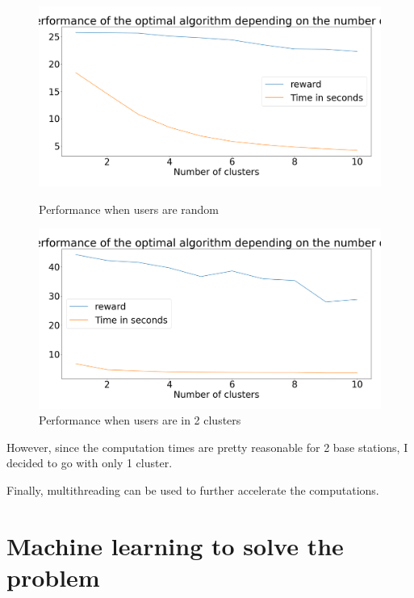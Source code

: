 \documentclass[letterpaper]{article}
\begin{document}
\begin{figure}[H]
    \centering
    \begin{minipage}[b]{0.45\textwidth}
        \centering
        \includegraphics[width=\textwidth]{images/Performance_opt_function_clusters.png}
        \caption{Performance when users are random}
    \end{minipage}
    \hspace{0.05\textwidth}
    \begin{minipage}[b]{0.45\textwidth}
        \centering
        \includegraphics[width=\textwidth]{images/Performance_opt_function_clusters_when_2clusters.png}
        \caption{Performance when users are in 2 clusters}
    \end{minipage}
\end{figure}

However, since the computation times are pretty reasonable for 2 base stations, I decided to go with only 1 cluster.

Finally, multithreading can be used to further accelerate the computations.

\section{Machine learning to solve the problem}
\end{document}
